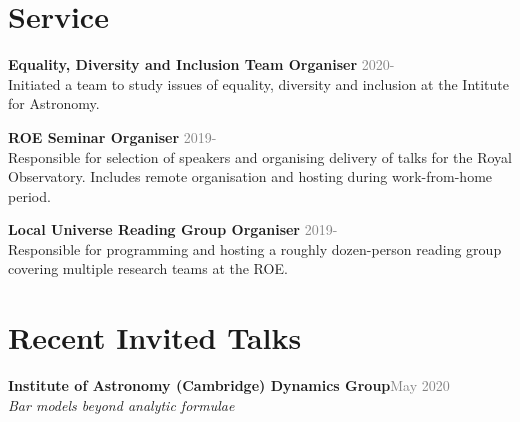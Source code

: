 \documentclass[margin, a4paper,11pt]{res} %
\begin{document}
\begin{resume}

\section{\sc \textcolor{redshade}{Service}}

{\bf Equality, Diversity and Inclusion Team Organiser} \hfill\textcolor{grey}{2020-}\\
Initiated a team to study issues of equality, diversity and inclusion at the Intitute for Astronomy.

{\bf ROE Seminar Organiser} \hfill\textcolor{grey}{2019-}\\
Responsible for selection of speakers and organising delivery of talks for the Royal Observatory. Includes remote organisation and hosting during work-from-home period.

{\bf Local Universe Reading Group Organiser} \hfill\textcolor{grey}{2019-}\\
Responsible for programming and hosting a roughly dozen-person reading group covering multiple research teams at the ROE.



%



\section{\sc \textcolor{redshade}{Recent Invited Talks}}
{\bf Institute of Astronomy (Cambridge) Dynamics Group}\hfill\textcolor{grey}{May 2020} \\
{\it Bar models beyond analytic formulae}


\end{resume}
\end{document}
